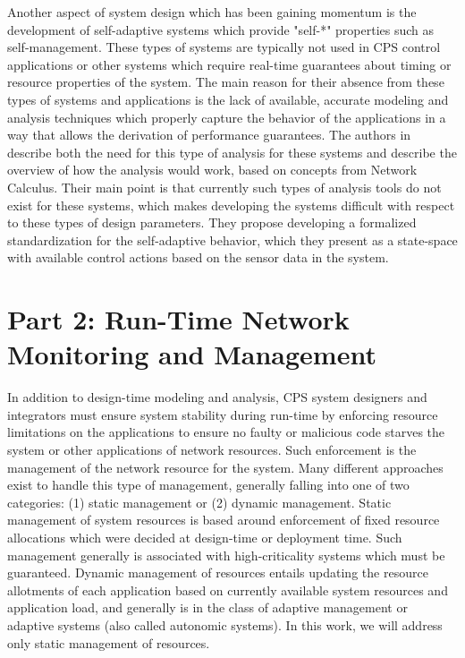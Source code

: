 Another aspect of system design which has been gaining momentum is the
development of self-adaptive systems which provide "self-*" properties
such as self-management.  These types of systems are typically not
used in CPS control applications or other systems which require
real-time guarantees about timing or resource properties of the
system.  The main reason for their absence from these types of systems
and applications is the lack of available, accurate modeling and
analysis techniques which properly capture the behavior of the
applications in a way that allows the derivation of performance
guarantees.  The authors in \cite{NCadaptivesystems} describe both the
need for this type of analysis for these systems and describe the
overview of how the analysis would work, based on concepts from
Network Calculus.  Their main point is that currently such types of
analysis tools do not exist for these systems, which makes developing
the systems difficult with respect to these types of design
parameters.  They propose developing a formalized standardization for
the self-adaptive behavior, which they present as a state-space with
available control actions based on the sensor data in the system.

\section{Part 2: Run-Time Network Monitoring and Management}
\label{sec:related_part2}

In addition to design-time modeling and analysis, CPS system designers
and integrators must ensure system stability during run-time by
enforcing resource limitations on the applications to ensure no faulty
or malicious code starves the system or other applications of network
resources.  Such enforcement is the management of the network resource
for the system.  Many different approaches exist to handle this type
of management, generally falling into one of two categories: (1)
static management or (2) dynamic management.  Static management of
system resources is based around enforcement of fixed resource
allocations which were decided at design-time or deployment time.
Such management generally is associated with high-criticality systems
which must be guaranteed.  Dynamic management of resources entails
updating the resource allotments of each application based on
currently available system resources and application load, and
generally is in the class of adaptive management or adaptive systems
(also called autonomic systems).  In this work, we will address only
static management of resources.

